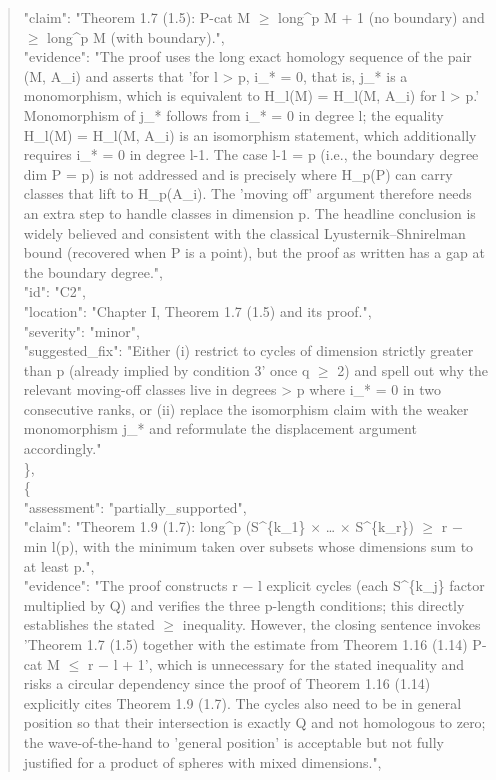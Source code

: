 \documentclass[11pt]{article}
\begin{document}
\begin{quote}
      "claim": "Theorem 1.7 (1.5): P-cat M \ensuremath{\ge} long\^{}p M + 1 (no boundary) and \ensuremath{\ge} long\^{}p M (with boundary).",\\
      "evidence": "The proof uses the long exact homology sequence of the pair (M, A\_i) and asserts that 'for l > p, i\_* = 0, that is, j\_* is a monomorphism, which is equivalent to H\_l(M) = H\_l(M, A\_i) for l > p.' Monomorphism of j\_* follows from i\_* = 0 in degree l; the equality H\_l(M) = H\_l(M, A\_i) is an isomorphism statement, which additionally requires i\_* = 0 in degree l-1. The case l-1 = p (i.e., the boundary degree dim P = p) is not addressed and is precisely where H\_p(P) can carry classes that lift to H\_p(A\_i). The 'moving off' argument therefore needs an extra step to handle classes in dimension p. The headline conclusion is widely believed and consistent with the classical Lyusternik--Shnirelman bound (recovered when P is a point), but the proof as written has a gap at the boundary degree.",\\
      "id": "C2",\\
      "location": "Chapter I, Theorem 1.7 (1.5) and its proof.",\\
      "severity": "minor",\\
      "suggested\_fix": "Either (i) restrict to cycles of dimension strictly greater than p (already implied by condition 3' once q \ensuremath{\ge} 2) and spell out why the relevant moving-off classes live in degrees > p where i\_* = 0 in two consecutive ranks, or (ii) replace the isomorphism claim with the weaker monomorphism j\_* and reformulate the displacement argument accordingly."\\
    \},\\
    \{\\
      "assessment": "partially\_supported",\\
      "claim": "Theorem 1.9 (1.7): long\^{}p (S\^{}\{k\_1\} \ensuremath{\times} … \ensuremath{\times} S\^{}\{k\_r\}) \ensuremath{\ge} r \ensuremath{-} min l(p), with the minimum taken over subsets whose dimensions sum to at least p.",\\
      "evidence": "The proof constructs r \ensuremath{-} l explicit cycles (each S\^{}\{k\_j\} factor multiplied by Q) and verifies the three p-length conditions; this directly establishes the stated \ensuremath{\ge} inequality. However, the closing sentence invokes 'Theorem 1.7 (1.5) together with the estimate from Theorem 1.16 (1.14) P-cat M \ensuremath{\le} r \ensuremath{-} l + 1', which is unnecessary for the stated inequality and risks a circular dependency since the proof of Theorem 1.16 (1.14) explicitly cites Theorem 1.9 (1.7). The cycles also need to be in general position so that their intersection is exactly Q and not homologous to zero; the wave-of-the-hand to 'general position' is acceptable but not fully justified for a product of spheres with mixed dimensions.",\\

\end{quote}
\end{document}
